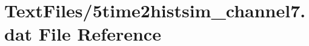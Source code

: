 \hypertarget{5time2histsim__channel7_8dat}{}\section{Text\+Files/5time2histsim\+\_\+channel7.dat File Reference}
\label{5time2histsim__channel7_8dat}
